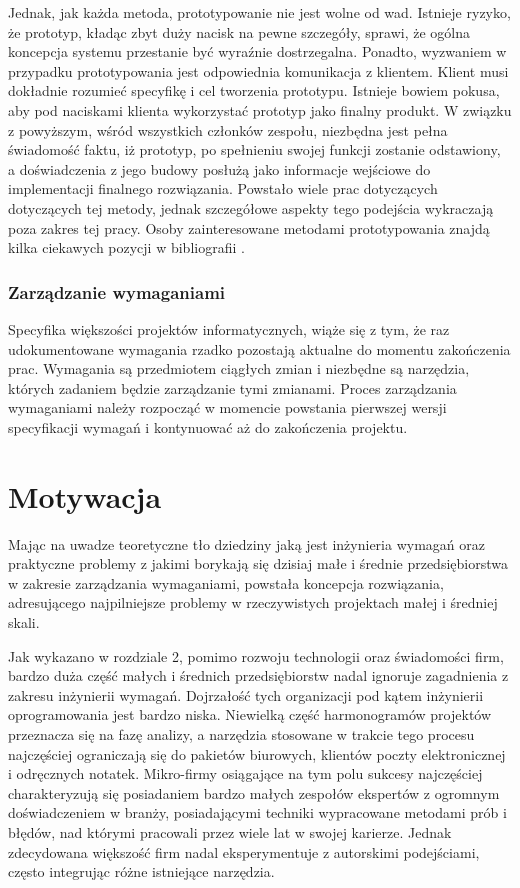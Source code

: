         Jednak, jak każda metoda, prototypowanie nie jest wolne od wad. Istnieje ryzyko, że prototyp, kładąc zbyt duży nacisk na pewne szczegóły, sprawi, że ogólna koncepcja systemu przestanie być wyraźnie dostrzegalna. Ponadto, wyzwaniem w przypadku prototypowania jest odpowiednia komunikacja z klientem. Klient musi dokładnie rozumieć specyfikę i cel tworzenia prototypu. Istnieje bowiem pokusa, aby pod naciskami klienta wykorzystać prototyp jako finalny produkt. W związku z powyższym, wśród wszystkich członków zespołu, niezbędna jest pełna świadomość faktu, iż prototyp, po spełnieniu swojej funkcji zostanie odstawiony, a doświadczenia z jego budowy posłużą jako informacje wejściowe do implementacji finalnego rozwiązania. Powstało wiele prac dotyczących dotyczących tej metody, jednak szczegółowe aspekty tego podejścia wykraczają poza zakres tej pracy. Osoby zainteresowane metodami prototypowania znajdą kilka ciekawych pozycji w bibliografii \cite{arnowitz2006effective, budde1992prototyping}.

      \subsubsection{Zarządzanie wymaganiami}

        Specyfika większości projektów informatycznych, wiąże się z tym, że raz udokumentowane wymagania rzadko pozostają aktualne do momentu zakończenia prac. Wymagania są przedmiotem ciągłych zmian i niezbędne są narzędzia, których zadaniem będzie zarządzanie tymi zmianami. Proces zarządzania wymaganiami należy rozpocząć w momencie powstania pierwszej wersji specyfikacji wymagań i kontynuować aż do zakończenia projektu.

  \section{Motywacja}

    Mając na uwadze teoretyczne tło dziedziny jaką jest inżynieria wymagań oraz praktyczne problemy z jakimi borykają się dzisiaj małe i średnie przedsiębiorstwa w zakresie zarządzania wymaganiami, powstała koncepcja rozwiązania, adresującego najpilniejsze problemy w rzeczywistych projektach małej i średniej skali. 

    Jak wykazano w rozdziale 2, pomimo rozwoju technologii oraz świadomości firm, bardzo duża część małych \linebreak i średnich przedsiębiorstw nadal ignoruje zagadnienia z zakresu inżynierii wymagań. Dojrzałość tych organizacji pod kątem inżynierii oprogramowania jest bardzo niska. Niewielką część harmonogramów projektów przeznacza się na fazę analizy, a narzędzia stosowane w trakcie tego procesu najczęściej ograniczają się do pakietów biurowych, klientów poczty elektronicznej i odręcznych notatek. Mikro-firmy osiągające na tym polu sukcesy najczęściej charakteryzują się posiadaniem bardzo małych zespołów ekspertów z ogromnym doświadczeniem w branży, posiadającymi techniki wypracowane metodami prób i błędów, nad którymi pracowali przez wiele lat w swojej karierze.  Jednak zdecydowana większość firm nadal eksperymentuje z autorskimi podejściami, często integrując różne istniejące narzędzia. 
    
